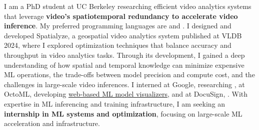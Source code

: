 \cvsummarysection


\begin{cvparagraph}

I am a PhD student at UC Berkeley researching efficient video analytics systems that leverage {\bf video's spatiotemporal redundancy to accelerate video inference}.
My preferred programming languages are \underline{} and \underline{}.
I designed and developed Spatialyze, a geospatial video analytics system published at VLDB 2024, where I explored optimization techniques that balance accuracy and throughput in video analytics tasks.
Through its development, I gained a deep understanding of how spatial and temporal knowledge can minimize expensive ML operations, the trade-offs between model precision and compute cost, and the challenges in large-scale video inferences.
I interned
at Google, researching \underline{},
at OctoML, developing \underline{web-based ML model visualizers},
and at DocuSign, \underline{}.
With expertise in ML inferencing and training infrastructure, I am seeking an {\bf internship in ML systems and optimization}, focusing on large-scale ML acceleration and infrastructure.
\end{cvparagraph}
\vspace{-1mm}
